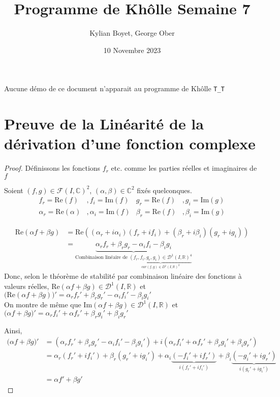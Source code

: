 \documentclass[french]{article}
\title{Programme de Khôlle Semaine 7}
\author{Kylian Boyet, George Ober}
\date{10 Novembre 2023}
\renewcommand{\Re}{\text{Re}}
\renewcommand{\Im}{\text{Im}}
\newcommand{\C}{\mathbb C}
\newcommand{\R}{\mathbb R}
\begin{document}
\maketitle

Aucune démo de ce document n'apparait au programme de Khôlle \verb|T_T|
\section{Preuve de la Linéarité de la dérivation d'une fonction complexe}
\begin{proof}
	
Définissons les fonctions $f_r$ etc. comme les parties réelles et imaginaires de $f$ 

Soient $(f, g) \in \mathcal{F}(I, \C)^2$, $(\alpha, \beta) \in \C^2$ fixés quelconques.
\begin{align*}
	f_r = \Re(f) &, f_i = \Im(f) &g_r = \Re(f) &, g_i = \Im(g)\\
	\alpha_r = \Re(\alpha) &, \alpha_i = \Im(f) &\beta_r = \Re(f) &, \beta_i = \Im(g)
\end{align*}

\begin{align*}
	\Re( \alpha f + \beta g) &= \Re((\alpha_r + i \alpha_i)(f_r + i f_i) + (\beta_r+ i\beta_i)(g_r+ i g_i)) \\
	&= \underbrace{\alpha_r f_r + \beta_r g_r - \alpha_i f_i - \beta_i g_i}_{\text{Combinaison linéaire de } \underbrace{(f_r, f_i, g_r, g_i) \in \mathcal D^1(I, \R)^4}_{car (f,g) \in D^1(I, \R)^2}}
\end{align*}
Donc, selon le théorème de stabilité par combinaison linéaire des fonctions à valeurs réelles, $\Re(\alpha f + \beta g) \in \mathcal D^1(I, \R)$ et $\big(\Re(\alpha f + \beta g)\big)' = \alpha_r f_r' + \beta_r g_r' - \alpha_i f_i' - \beta_i g_i'$
\\
On montre de même que $\Im(\alpha f + \beta g) \in \mathcal D^1(I, \R)$ et $\big(\alpha f + \beta g\big)' = \alpha_r f_i' +\alpha f_r' +\beta_r g_i' +\beta_i g_r'$

Ainsi,
\begin{align*}
	\big( \alpha f + \beta g \big)' &= (\alpha_r f_r' + \beta_r g_r' - \alpha_i f_i' - \beta_i g_i') + i (\alpha_r f_i' +\alpha f_r' +\beta_r g_i' +\beta_i g_r') \\
	&= \alpha_r(f_r' + if_i') + \beta_r(g_r' + ig_i') + \alpha_i \underbrace{(-f_i' + if_r')}_{i(f_r' + if_i')} + \beta_i \underbrace{( -g_i' + ig_r')}_{i(g_r' + ig_i')} \\
	&=\alpha f' + \beta g'
\end{align*}

\end{proof}
\end{document}
